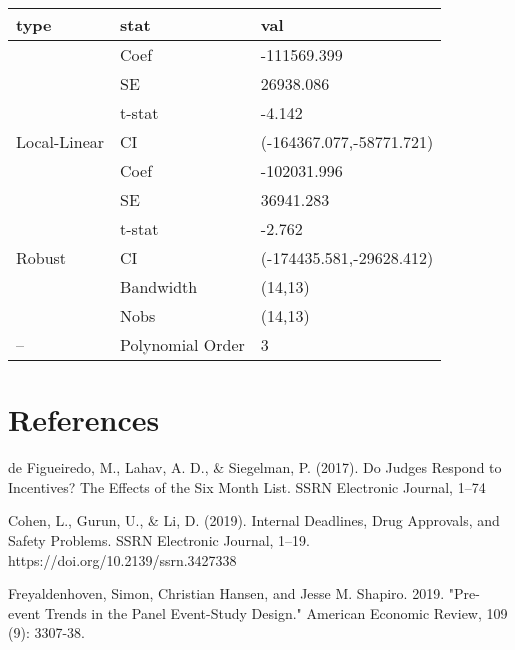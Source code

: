 \documentclass[12pt]{article}
\begin{document}
\begin{tabular}{lll}
\toprule
type & stat & val\\
\midrule
 & Coef & -111569.399\\

 & SE & 26938.086\\

 & t-stat & -4.142\\

\multirow{-4}{*}{\raggedright\arraybackslash Local-Linear} & CI & (-164367.077,-58771.721)\\
\cmidrule{1-3}
 & Coef & -102031.996\\

 & SE & 36941.283\\

 & t-stat & -2.762\\

\multirow{-4}{*}{\raggedright\arraybackslash Robust} & CI & (-174435.581,-29628.412)\\
\cmidrule{1-3}
 & Bandwidth & (14,13)\\

 & Nobs & (14,13)\\

\multirow{-3}{*}{\raggedright\arraybackslash --} & Polynomial Order & 3\\
\bottomrule
\end{tabular}

\section{References}

\begin{referece}
\label{ref:ref1}
de Figueiredo, M., Lahav, A. D., & Siegelman, P. (2017). Do Judges Respond to Incentives? 
The Effects of the Six Month List. SSRN Electronic Journal, 1–74 
\end{referece}

\begin{referece}
Cohen, L., Gurun, U., & Li, D. (2019). Internal Deadlines, Drug Approvals, and Safety Problems. SSRN Electronic Journal, 1–19. https://doi.org/10.2139/ssrn.3427338
\end{referece}

\begin{referece}
Freyaldenhoven, Simon, Christian Hansen, and Jesse M. Shapiro. 2019. "Pre-event Trends in the Panel Event-Study Design." American Economic Review, 109 (9): 3307-38.
\end{referece}
\end{document}
